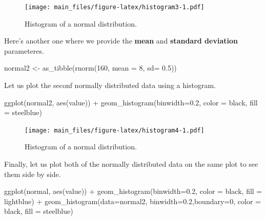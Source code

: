 \documentclass[
]{book}
\newenvironment{Shaded}{\begin{snugshade}}{\end{snugshade}}
\newcommand{\AttributeTok}[1]{\textcolor[rgb]{0.77,0.63,0.00}{#1}}
\newcommand{\DecValTok}[1]{\textcolor[rgb]{0.00,0.00,0.81}{#1}}
\newcommand{\FloatTok}[1]{\textcolor[rgb]{0.00,0.00,0.81}{#1}}
\newcommand{\FunctionTok}[1]{\textcolor[rgb]{0.00,0.00,0.00}{#1}}
\newcommand{\NormalTok}[1]{#1}
\newcommand{\OtherTok}[1]{\textcolor[rgb]{0.56,0.35,0.01}{#1}}
\newcommand{\SpecialCharTok}[1]{\textcolor[rgb]{0.00,0.00,0.00}{#1}}
\newcommand{\StringTok}[1]{\textcolor[rgb]{0.31,0.60,0.02}{#1}}
\begin{document}
\begin{figure}
\centering
\texttt{[image: main\_files/figure-latex/histogram3-1.pdf]}
\caption{\label{fig:histogram3}Histogram of a normal distribution.}
\end{figure}

Here's another one where we provide the \textbf{mean} and \textbf{standard deviation} parameteres.

\begin{Shaded}
\begin{Highlighting}[]
\NormalTok{normal2 }\OtherTok{\textless{}{-}} \FunctionTok{as\_tibble}\NormalTok{(}\FunctionTok{rnorm}\NormalTok{(}\DecValTok{160}\NormalTok{, }\AttributeTok{mean =} \DecValTok{8}\NormalTok{, }\AttributeTok{sd=} \FloatTok{0.5}\NormalTok{))}
\end{Highlighting}
\end{Shaded}

Let us plot the seconf normally distributed data using a histogram.

\begin{Shaded}
\begin{Highlighting}[]
\FunctionTok{ggplot}\NormalTok{(normal2, }\FunctionTok{aes}\NormalTok{(value)) }\SpecialCharTok{+}
        \FunctionTok{geom\_histogram}\NormalTok{(}\AttributeTok{binwidth=}\FloatTok{0.2}\NormalTok{,}
                       \AttributeTok{color =} \StringTok{\textquotesingle{}black\textquotesingle{}}\NormalTok{,}
                       \AttributeTok{fill =} \StringTok{\textquotesingle{}steelblue\textquotesingle{}}\NormalTok{)}
\end{Highlighting}
\end{Shaded}

\begin{figure}
\centering
\texttt{[image: main\_files/figure-latex/histogram4-1.pdf]}
\caption{\label{fig:histogram4}Histogram of a normal distribution.}
\end{figure}

Finally, let us plot both of the normally distributed data on the same plot to see them side by side.

\begin{Shaded}
\begin{Highlighting}[]
\FunctionTok{ggplot}\NormalTok{(normal, }\FunctionTok{aes}\NormalTok{(value)) }\SpecialCharTok{+}
        \FunctionTok{geom\_histogram}\NormalTok{(}\AttributeTok{binwidth=}\FloatTok{0.2}\NormalTok{,}
                       \AttributeTok{color =} \StringTok{\textquotesingle{}black\textquotesingle{}}\NormalTok{,}
                       \AttributeTok{fill =} \StringTok{\textquotesingle{}lightblue\textquotesingle{}}\NormalTok{) }\SpecialCharTok{+}
          \FunctionTok{geom\_histogram}\NormalTok{(}\AttributeTok{data=}\NormalTok{normal2, }\AttributeTok{binwidth=}\FloatTok{0.2}\NormalTok{,}\AttributeTok{boundary=}\DecValTok{0}\NormalTok{,}
                       \AttributeTok{color =} \StringTok{\textquotesingle{}black\textquotesingle{}}\NormalTok{,}
                       \AttributeTok{fill =} \StringTok{\textquotesingle{}steelblue\textquotesingle{}}\NormalTok{)}
\end{Highlighting}
\end{Shaded}
\end{document}
